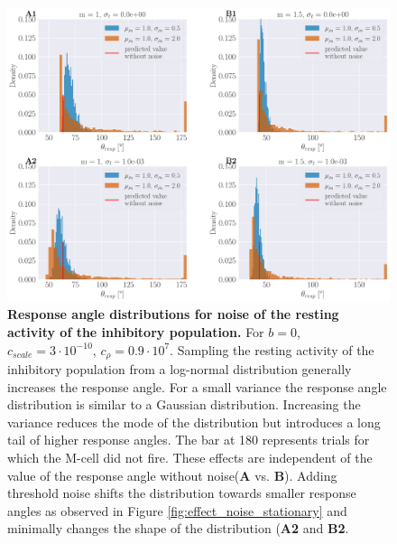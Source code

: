 \documentclass[a4paper,10pt,hidelinks]{scrreprt}
\begin{document}
    \begin{figure}[H]
    	\begin{center}
			\includegraphics[width=\textwidth]{figure_stationary_rho_null_noise.pdf}
    	\end{center}
    	\caption{\textbf{Response angle distributions for noise of the resting activity of the inhibitory population.} For $b=0$, $c_{scale}=3\cdot10^{-10}$, $c_{\rho}=0.9\cdot 10^{7}$. Sampling the resting activity of the inhibitory population from a log-normal distribution generally increases the response angle. For a small variance the response angle distribution is similar to a Gaussian distribution. Increasing the variance reduces the mode of the distribution but introduces a long tail of higher response angles. The bar at 180 \textdegree{} represents trials for which the M-cell did not fire. These effects are independent of the value of the response angle without noise(\textbf{A} vs. \textbf{B}). Adding threshold noise shifts the distribution towards smaller response angles as observed in Figure \ref{fig:effect_noise_stationary} and minimally changes the shape of the distribution (\textbf{A2} and \textbf{B2}.}
    	\label{fig:effect_rho_null_stationary}
    \end{figure}
    
\end{document}
